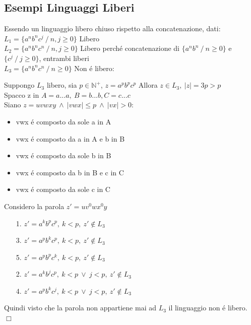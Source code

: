 \subsection{Esempi Linguaggi Liberi}
Essendo un linguaggio libero chiuso rispetto alla concatenazione, dati:\\
$L_1 = \{a^nb^nc^j \ / \ n, j \geq 0\} $ Libero\\
$L_2 = \{a^nb^nc^n \ / \ n,j \geq 0\}$ Libero perch\'e concatenazione di $\{a^nb^n\ / \ n \geq 0 \}$ e $\{ c^j \ / \ j \geq 0 \}$, entrambi liberi\\
$L_3 = \{a^nb^nc^n \ / \ n \geq 0\}$ Non \'e libero:

Suppongo $L_3$ libero, sia $p \in \mathbb{N}^+$, $z = a^pb^pc^p$
Allora $z \in  L_3,\ |z|=3p>p$\\
Spacco z in $A=a...a,\ B = b...b, C=c...c$\\
Siano $z = uvwxy\ \land\ |vwx| \leq p \ \land\ |vx| > 0 $:
\begin{itemize}
    \item vwx \'e composto da sole a in A\\
    \item vwx \'e composto da a in A e b in B\\
    \item vwx \'e composto da sole b in B\\
    \item vwx \'e composto da b in B e c in C\\
    \item vwx \'e composto da sole c in C\\
\end{itemize} 
Considero la parola $z' = uv^0wx^0y$ 
\begin{itemize}
    \item[1.] $z' = a^kb^pc^p,\ k<p,\ z' \not\in L_3 $\\
    \item[3.] $z' = a^pb^kc^p,\ k<p,\ z' \not\in L_3 $\\
    \item[5.] $z' = a^pb^pc^k,\ k<p,\ z' \not\in L_3 $\\
    \item[2.] $z' = a^kb^jc^p,\ k<p\ \lor\ j < p ,\ z' \not\in L_3 $\\
    \item[4.] $z' = a^pb^kc^j,\ k<p\ \lor\ j < p ,\ z' \not\in L_3 $\\
\end{itemize}
Quindi visto che la parola non appartiene mai ad $L_3$ il linguaggio non \'e libero.
$\Box$\\[5pt]

